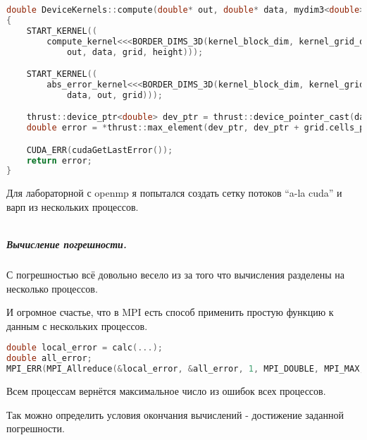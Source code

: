 \documentclass[12pt]{article}
\begin{document}
\begin{lstlisting}[language=c++,basicstyle=\scriptsize]
double DeviceKernels::compute(double* out, double* data, mydim3<double> height)
{
    START_KERNEL((
        compute_kernel<<<BORDER_DIMS_3D(kernel_block_dim, kernel_grid_dim)>>>(
            out, data, grid, height)));

    START_KERNEL((
        abs_error_kernel<<<BORDER_DIMS_3D(kernel_block_dim, kernel_grid_dim)>>>(
            data, out, grid)));

    thrust::device_ptr<double> dev_ptr = thrust::device_pointer_cast(data);
    double error = *thrust::max_element(dev_ptr, dev_ptr + grid.cells_per_block());

    CUDA_ERR(cudaGetLastError());
    return error;
}
\end{lstlisting}

Для лабораторной с openmp я попытался создать сетку потоков ``a-la cuda'' и варп из нескольких процессов.

\begin{lstlisting}

\end{lstlisting}

\subparagraph*{Вычисление погрешности.}

С погрешностью всё довольно весело из за того что вычисления разделены на несколько процессов.

И огромное счастье, что в MPI есть способ применить простую функцию к данным с нескольких процессов.

\begin{lstlisting}[language=c++]
double local_error = calc(...);
double all_error;
MPI_ERR(MPI_Allreduce(&local_error, &all_error, 1, MPI_DOUBLE, MPI_MAX, MPI_COMM_WORLD));
\end{lstlisting}

Всем процессам вернётся максимальное число из ошибок всех процессов.

Так можно определить условия окончания вычислений - достижение заданной погрешности.




\end{document}
